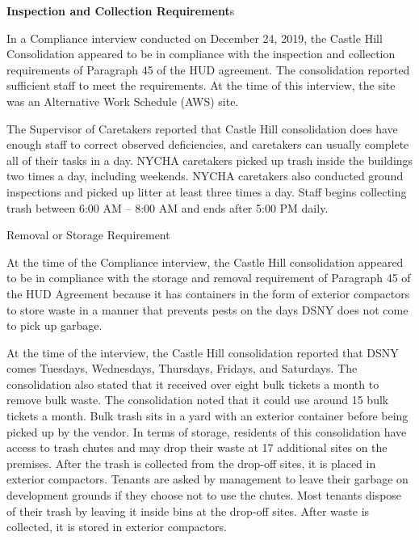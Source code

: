


\textbf{Inspection and Collection Requirement}s 

 

In a Compliance interview conducted on December 24, 2019, the Castle Hill Consolidation appeared to be in compliance with the inspection and collection requirements of Paragraph 45 of the HUD agreement. The consolidation reported sufficient staff to meet the requirements. At the time of this interview, the site was an Alternative Work Schedule (AWS) site.

 

The Supervisor of Caretakers reported that Castle Hill consolidation does have enough staff to correct observed deficiencies, and caretakers  can usually complete all of their tasks in a day. NYCHA caretakers picked up trash inside the buildings two times a day, including weekends. NYCHA caretakers also conducted ground inspections and picked up litter at least three times a day. Staff begins collecting trash between 6:00 AM -- 8:00 AM and ends after 5:00 PM daily.



Removal or Storage Requirement 

 

At the time of the Compliance interview, the Castle Hill consolidation appeared to be in compliance with the storage and removal requirement of Paragraph 45 of the HUD Agreement because it has containers in the form of exterior compactors to store waste in a manner that prevents pests on the days DSNY does not come to pick up garbage. 

  

At the time of the interview, the Castle Hill consolidation reported that DSNY comes Tuesdays, Wednesdays, Thursdays, Fridays, and Saturdays. The consolidation also stated that it received over eight bulk tickets a month to remove bulk waste. The consolidation noted that it could use around 15 bulk tickets a month. Bulk trash sits in a yard with an exterior container before being picked up by the vendor. In terms of storage, residents of this consolidation have access to trash chutes and may drop their waste at 17 additional sites on the premises. After the trash is collected from the drop-off sites, it is placed in exterior compactors. Tenants are asked by management to leave their garbage on development grounds if they choose not to use the chutes. Most tenants dispose of their trash by leaving it inside bins at the drop-off sites. After waste is collected, it is stored in exterior compactors. 

